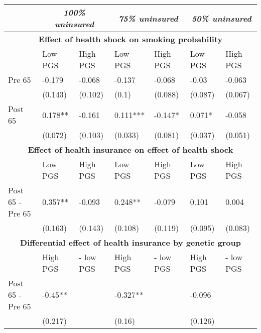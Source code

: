 % 
\begin{tabular}{ l | p{2cm}p{2cm}| p{2cm}p{2cm}| p{2cm}p{2cm}}
  & \multicolumn{2}{c}{ \textit{100\% uninsured}} & \multicolumn{2}{c}{ \textit{75\% uninsured}} & \multicolumn{2}{c}{ \textit{50\% uninsured}} \\
 \toprule
  \multicolumn{7}{c}{ \textbf{Effect of health shock on smoking probability}} \\
 \midrule
 & Low PGS & High PGS & Low PGS & High PGS & Low PGS & High PGS \\ 
   \midrule
Pre 65 & -0.179 & -0.068 & -0.137 & -0.068 & -0.03 & -0.063 \\ 
   & (0.143) & (0.102) & (0.1) & (0.088) & (0.087) & (0.067) \\ 
  Post 65 & 0.178** & -0.161 & 0.111*** & -0.147* & 0.071* & -0.058 \\ 
   & (0.072) & (0.103) & (0.033) & (0.081) & (0.037) & (0.051) \\ 
   \toprule \multicolumn{7}{c}{ \textbf{Effect of health insurance on effect of health shock}} \\
 \midrule
 & Low PGS & High PGS & Low PGS & High PGS & Low PGS & High PGS \\ 
   \midrule
Post 65 - Pre 65 & 0.357** & -0.093 & 0.248** & -0.079 & 0.101 & 0.004 \\ 
   & (0.163) & (0.143) & (0.108) & (0.119) & (0.095) & (0.083) \\ 
   \toprule \multicolumn{7}{c}{ \textbf{Differential effect of health insurance by genetic group}} \\
 \midrule
 & High PGS  & - low PGS & High PGS  & - low PGS & High PGS  & - low PGS \\ 
   \midrule
Post 65 - Pre 65 & -0.45** &  & -0.327** &  & -0.096 &  \\ 
   & (0.217) &  & (0.16) &  & (0.126) &  \\ 
  \end{tabular}
